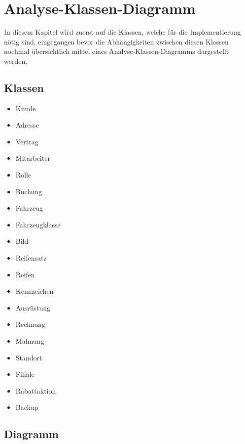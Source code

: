 \chapter{Analyse-Klassen-Diagramm}

In diesem Kapitel wird zuerst auf die Klassen, welche für die Implementierung nötig sind, eingegangen bevor die Abhängigkeiten zwischen diesen Klassen nochmal übersichtlich mittel eines Analyse-Klassen-Diagramms dargestellt werden.

\section{Klassen}
\begin{multicols}{2}
\begin{itemize}
    \item Kunde
    \item Adresse
    \item Vertrag
    \item Mitarbeiter
    \item Rolle
    \item Buchung
    \item Fahrzeug
    \item Fahrzeugklasse
    \item Bild
    \item Reifensatz
    \item Reifen
    \item Kennzeichen
    \item Ausrüstung
    \item Rechnung
    \item Mahnung
    \item Standort
    \item Filiale
    \item Rabattaktion
    \item Backup
\end{itemize}
\end{multicols}


\section{Diagramm}